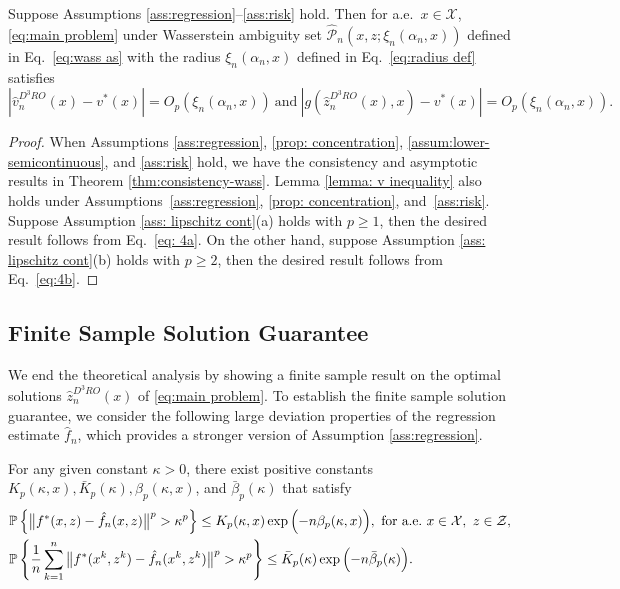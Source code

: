 \documentclass[onefignum,onetabnum]{siamart251216}
\begin{document}
\begin{theorem}\label{thm:roc}
 Suppose Assumptions \ref{ass:regression}--\ref{ass:risk} hold. Then for a.e.\ $x \in \mathcal{X}$, \eqref{eq:main problem} under Wasserstein ambiguity set $\hat{\mathcal{P}}_n(x,z;\xi_n(\alpha_n,x))$ defined in Eq.~\eqref{eq:wass as} with the radius $\xi_n(\alpha_n,x)$ defined in Eq.~\eqref{eq:radius def} satisfies
 \[
 |\hat{v}_n^{D^3RO}(x)-v^*(x)|=O_p(\xi_n(\alpha_n,x))\ \text{and}\  |g(\hat{z}_n^{D^3RO}(x),x)-v^*(x)|=O_p(\xi_n(\alpha_n,x)).
 \]
\end{theorem}
\begin{proof}
    When Assumptions \ref{ass:regression}, \ref{prop: concentration}, \ref{assum:lower-semicontinuous}, and \ref{ass:risk} hold, we have the consistency and asymptotic results in Theorem \ref{thm:consistency-wass}. Lemma \ref{lemma: v inequality} also holds under Assumptions\ \ref{ass:regression}, \ref{prop: concentration}, and~\ref{ass:risk}. Suppose Assumption \ref{ass: lipschitz cont}(a) holds with $p \geq 1$, then the desired result follows from Eq.~\eqref{eq: 4a}. On the other hand, suppose Assumption \ref{ass: lipschitz cont}(b) holds with $p \geq 2$, then the desired result follows from Eq.~\eqref{eq:4b}.
\end{proof}

\subsection{Finite Sample Solution Guarantee} 

We end the theoretical analysis by showing a finite sample result on the optimal solutions $\hat{z}_n^{D^3RO}(x)$ of \eqref{eq:main problem}. 
To establish the finite sample solution guarantee, we consider the following large deviation properties of the regression estimate $\hat{f}_n$, which provides a stronger version of Assumption \ref{ass:regression}.

\begin{assumption}\label{ass:reg constant}
For any given constant $\kappa > 0$, there exist positive constants $K_{p}(\kappa,x), \bar{K}_{p}(\kappa), \beta_{p}(\kappa,x)$, and $\bar{\beta}_{p}(\kappa)$ that satisfy
\small
\begin{align*}
        &\mathbb{P}\left\{\big\|f^*(x,z)-\hat{f}_n(x,z)\big\|^p > \kappa^p \right\} \leq K_{p}(\kappa,x) \exp{\Bigl(-n \beta_{p}(\kappa,x)\Bigr)},~\text{for a.e.}~x \in \mathcal{X},\ z \in \mathcal{Z},
        \\
        &\mathbb{P}\left\{\frac{1}{n}\sum_{k=1}^n \big\|f^*(x^k,z^k)-\hat{f}_n(x^k,z^k)\big\|^p > \kappa^p\right\} \leq \bar{K}_{p}(\kappa) \exp{\Bigl(-n \bar{\beta}_{p}(\kappa)\Bigr)}.
    \end{align*}
    \normalsize
\end{assumption}
\end{document}
